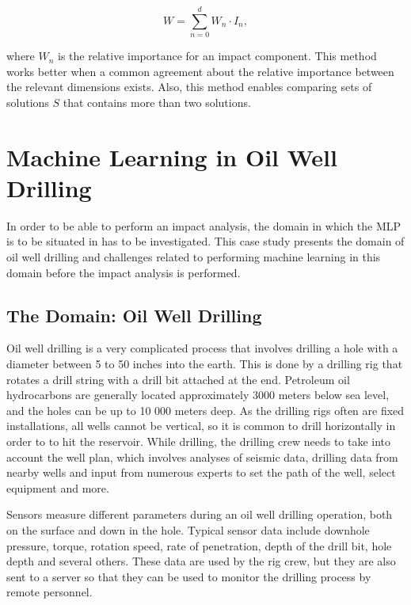 \documentclass{article}
\begin{document}
\begin{equation}
W = \sum_{n=0}^d W_n \cdot I_n,
\end{equation}

where $W_n$ is the relative importance for an impact component. This method works better when a common agreement about the relative importance between the relevant dimensions exists.
Also, this method enables comparing sets of solutions $S$ that contains more than two solutions.

\section{Machine Learning in Oil Well Drilling}
\label{sec:case_study:oil_well_drilling}
In order to be able to perform an impact analysis, the domain in which the MLP is to be situated in has to be investigated.
This case study presents the domain of oil well drilling and challenges related to performing machine learning in this domain before the impact analysis is performed.


\subsection{The Domain: Oil Well Drilling}
Oil well drilling is a very complicated process that involves drilling a hole with a diameter between 5 to 50 inches into the earth.
This is done by a drilling rig that rotates a drill string with a drill bit attached at the end. 
Petroleum oil hydrocarbons are generally located approximately 3000 meters below sea level, and the holes can be up to 10 000 meters deep. 
As the drilling rigs often are fixed installations, all wells cannot be vertical, so it is common to drill horizontally in order to to hit the reservoir. 
While drilling, the drilling crew needs to take into account the well plan, which involves analyses of seismic data, drilling data from nearby wells  and input from numerous experts to set the path of the well, select equipment and more. 

Sensors measure different parameters during an oil well drilling operation, both on the surface and down in the hole.
Typical sensor data include downhole pressure, torque, rotation speed, rate of penetration, depth of the drill bit, hole depth and several others.
These data are used by the rig crew, but they are also sent to a server so that they can be used to monitor the drilling process by remote personnel.
\end{document}
